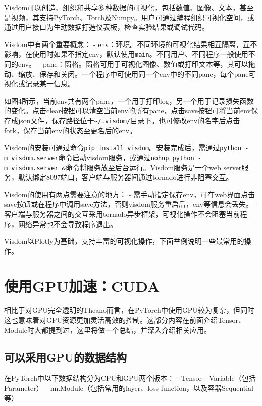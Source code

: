 \documentclass[11pt]{article}
\begin{document}
Visdom可以创造、组织和共享多种数据的可视化，包括数值、图像、文本，甚至是视频，其支持PyTorch、Torch及Numpy。用户可通过编程组织可视化空间，或通过用户接口为生动数据打造仪表板，检查实验结果或调试代码。

Visdom中有两个重要概念： -
env：环境。不同环境的可视化结果相互隔离，互不影响，在使用时如果不指定env，默认使用\texttt{main}。不同用户、不同程序一般使用不同的env。
-
pane：窗格。窗格可用于可视化图像、数值或打印文本等，其可以拖动、缩放、保存和关闭。一个程序中可使用同一个env中的不同pane，每个pane可视化或记录某一信息。

如图4所示，当前env共有两个pane，一个用于打印log，另一个用于记录损失函数的变化。点击clear按钮可以清空当前env的所有pane，点击save按钮可将当前env保存成json文件，保存路径位于\texttt{\textasciitilde{}/.visdom/}目录下。也可修改env的名字后点击fork，保存当前env的状态至更名后的env。

Visdom的安装可通过命令\texttt{pip\ install\ visdom}。安装完成后，需通过\texttt{python\ -m\ visdom.server}命令启动visdom服务，或通过\texttt{nohup\ python\ -m\ visdom.server\ \&}命令将服务放至后台运行。Visdom服务是一个web
server服务，默认绑定8097端口，客户端与服务器间通过tornado进行非阻塞交互。

Visdom的使用有两点需要注意的地方： -
需手动指定保存env，可在web界面点击save按钮或在程序中调用save方法，否则visdom服务重启后，env等信息会丢失。
-
客户端与服务器之间的交互采用tornado异步框架，可视化操作不会阻塞当前程序，网络异常也不会导致程序退出。

Visdom以Plotly为基础，支持丰富的可视化操作，下面举例说明一些最常用的操作。

    \section{使用GPU加速：CUDA}\label{ux4f7fux7528gpuux52a0ux901fcuda}

相比于对GPU完全透明的Theano而言，在PyTorch中使用GPU较为复杂，但同时这也意味着对GPU资源更加灵活高效的控制。这部分内容在前面介绍Tensor、Module时大都提到过，这里将做一个总结，并深入介绍相关应用。

\subsection{可以采用GPU的数据结构}\label{ux53efux4ee5ux91c7ux7528gpuux7684ux6570ux636eux7ed3ux6784}

在PyTorch中以下数据结构分为CPU和GPU两个版本： - Tensor -
Variable（包括Parameter） - nn.Module（包括常用的layer、loss
function，以及容器Sequential等）
\end{document}
